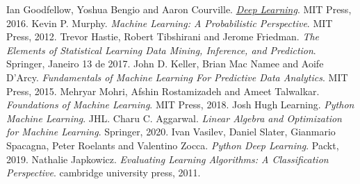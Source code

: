 \documentclass[runningheads]{llncs}
\begin{document}

\newpage

\newpage
\hfill

\newpage

\newpage

\newpage

\newpage

%
%
%
% 
% 
%
\begin{thebibliography}{8}

 Ian Goodfellow, Yoshua Bengio and Aaron Courville. \href{http://www.deeplearningbook.org/contents/TOC.html}{\textit{Deep Learning}}. MIT Press, 2016.
 Kevin P. Murphy. \textit{Machine Learning: A Probabilistic Perspective}. MIT Press, 2012.
 Trevor Hastie, Robert Tibshirani and Jerome Friedman. \textit{The Elements of Statistical Learning Data Mining, Inference, and Prediction}. Springer, Janeiro 13 de 2017.
 John D. Keller, Brian Mac Namee and Aoife D'Arcy. \textit{Fundamentals of Machine Learning For Predictive Data Analytics}. MIT Press, 2015.
 Mehryar Mohri, Afshin Rostamizadeh and Ameet Talwalkar. \textit{Foundations of Machine Learning}. MIT Press, 2018.
 Josh Hugh Learning. \textit{Python Machine Learning}. JHL.
 Charu C. Aggarwal. \textit{Linear Algebra and Optimization for Machine Learning}. Springer, 2020.
 Ivan Vasilev, Daniel Slater, Gianmario Spacagna, Peter Roelants and Valentino Zocca. \textit{Python Deep Learning}. Packt, 2019.
 Nathalie Japkowicz. \textit{Evaluating Learning Algorithms: A Classification Perspective}. cambridge university press, 2011.
\end{thebibliography}
%
\end{document}
